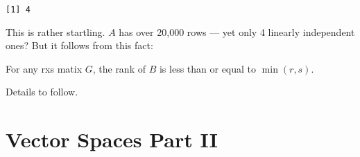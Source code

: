 \documentclass[
  letterpaper,
  DIV=11,
  numbers=noendperiod,
  oneside]{scrreprt}
\begin{document}
\begin{verbatim}
[1] 4
\end{verbatim}

This is rather startling. \(A\) has over 20,000 rows --- yet only 4
linearly independent ones?{} But it follows
from this fact:

For any rxs matix \(G\), the rank of \(B\) is less than or equal to
\(\min(r,s)\).

Details to follow.


\hypertarget{vector-spaces-part-ii}{%
\chapter{Vector Spaces Part II}\label{vector-spaces-part-ii}}

\newpage{}
\end{document}
